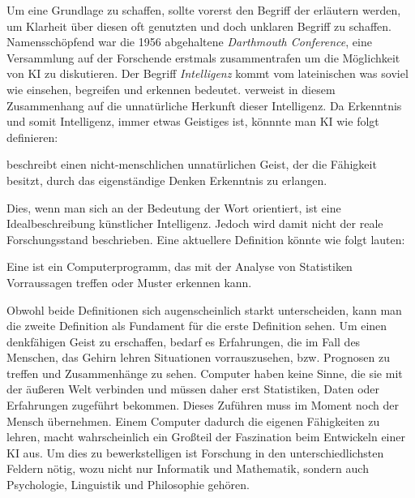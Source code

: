 \documentclass[12pt,german,ngerman]{report}
\begin{document}
    Um eine Grundlage zu schaffen, sollte vorerst den Begriff der 
    erläutern werden, um Klarheit über diesen oft genutzten und doch unklaren Begriff zu schaffen.
    Namensschöpfend war die 1956 abgehaltene \emph{Darthmouth Conference}\cite[57]{buchanan2005very}, 
    eine Versammlung auf der 
    Forschende erstmals zusammentrafen um die Möglichkeit von KI zu diskutieren.
    Der Begriff \emph{Intelligenz} kommt vom lateinischen  was soviel wie
    einsehen, begreifen und erkennen bedeutet.\cite{piaget2000psychologie}
     verweist in diesem Zusammenhang auf die unnatürliche Herkunft dieser Intelligenz.
    Da Erkenntnis und somit Intelligenz, immer etwas Geistiges ist\cite{duden2021erkenntnis}, könnnte
    man KI wie folgt definieren:
    \begin{displayquote}
         beschreibt einen nicht-menschlichen
        unnatürlichen Geist, der die Fähigkeit besitzt, 
        durch das eigenständige Denken Erkenntnis zu erlangen.
    \end{displayquote}
    Dies, wenn man sich an der Bedeutung der Wort orientiert, ist eine Idealbeschreibung künstlicher Intelligenz.
    Jedoch wird damit nicht der reale Forschungsstand beschrieben.
    Eine aktuellere Definition könnte wie folgt lauten:
    \begin{displayquote}
        Eine  ist ein Computerprogramm, das 
        mit der Analyse von Statistiken Vorraussagen treffen oder Muster erkennen kann.
    \end{displayquote}
    Obwohl beide Definitionen sich augenscheinlich starkt unterscheiden, kann man die zweite Definition als Fundament für
    die erste Definition sehen. Um einen denkfähigen Geist zu erschaffen, bedarf es Erfahrungen, die im Fall des Menschen,
    das Gehirn lehren Situationen vorrauszusehen, bzw. Prognosen zu treffen und Zusammenhänge zu sehen.
    Computer haben keine Sinne, die sie mit der äußeren Welt verbinden und 
    müssen daher erst Statistiken, Daten oder Erfahrungen zugeführt bekommen.
    Dieses Zuführen muss im Moment noch der Mensch übernehmen.
    Einem Computer dadurch die eigenen Fähigkeiten zu lehren, macht wahrscheinlich ein Großteil der Faszination
    beim Entwickeln einer KI aus. Um dies zu bewerkstelligen ist Forschung in den unterschiedlichsten Feldern nötig,
    wozu nicht nur Informatik und Mathematik, sondern auch Psychologie, Linguistik und Philosophie\cite{buchanan2005very} gehören.\\
\end{document}
